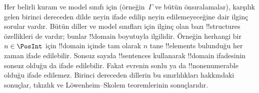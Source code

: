 \documentclass[../../../include/open-logic-section]{subfiles}
\begin{document}
Her belirli kuram ve model sınıfı için (örneğin~$\Gamma$ ve bütün
önsıralamalar), karşılık gelen birinci dereceden dilde neyin ifade
edilip neyin edilemeyeceğine dair ilginç sorular vardır. Bütün diller
ve model sınıfları için ilginç olan bazı !!{structure}s özellikleri de
vardır; bunlar !!{domain} boyutuyla ilgilidir. Örneğin herhangi bir
$n\in\PosInt$ için !!{domain} içinde tam olarak $n$ tane !!{element}s
bulunduğu her zaman ifade edilebilir. Sonsuz sayıda !!{sentence}s
kullanarak !!{domain} ifadesinin sonsuz olduğu da ifade edilebilir.
Fakat evrenin sonlu ya da !!{nonenumerable} olduğu ifade edilemez.
Birinci dereceden dillerin bu sınırlılıkları hakkındaki sonuçlar,
tıkızlık ve Löwenheim--Skolem teoremlerinin sonuçlarıdır.
\end{document}

